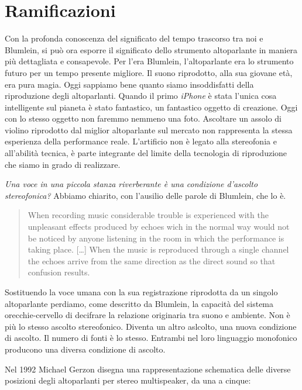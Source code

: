 \section{Ramificazioni}

Con la profonda conoscenza del significato del tempo trascorso tra noi e Blumlein,
si può ora esporre il significato dello strumento altoparlante in maniera più
dettagliata e consapevole. Per l'era
Blumlein, l'altoparlante era lo strumento futuro per un tempo presente migliore.
Il suono riprodotto, alla sua giovane età, era pura magia. Oggi sappiamo bene
quanto siamo insoddisfatti della riproduzione degli altoparlanti. Quando il
primo \emph{iPhone} è stata l'unica cosa intelligente sul pianeta è stato fantastico,
un fantastico oggetto di creazione. Oggi con lo stesso oggetto non faremmo
nemmeno una foto. Ascoltare un assolo di violino riprodotto dal miglior
altoparlante sul mercato non rappresenta la stessa esperienza della performance reale.
L'artificio non è legato alla stereofonia e all'abilità tecnica, è parte integrante del
limite della tecnologia di riproduzione che siamo in grado di realizzare.

\emph{Una voce in una piccola stanza riverberante è una condizione d'ascolto
stereofonica?} Abbiamo chiarito, con l'ausilio delle parole di Blumlein, che lo è.

\begin{quotation}
When recording music considerable trouble is experienced with the unpleasant
effects produced by echoes wich in the normal way would not be noticed by anyone
listening in the room in which the performance is taking place. [\ldots]
When the music is reproduced through
a single channel the echoes arrive from the same direction as the direct sound
so that confusion results.
\end{quotation}

Sostituendo la voce umana con la sua registrazione riprodotta da un singolo
altoparlante perdiamo, come descritto da Blumlein, la capacità del sistema
orecchie-cervello di decifrare la relazione originaria tra suono e ambiente.
Non è più lo stesso ascolto stereofonico. Diventa un altro aslcolto, una nuova
condizione di ascolto. Il numero di fonti è lo stesso. Entrambi nel loro
linguaggio monofonico producono una diversa condizione di ascolto.

Nel 1992 Michael Gerzon disegna una rappresentazione schematica delle diverse
posizioni degli altoparlanti per stereo multispeaker, da una a cinque:

